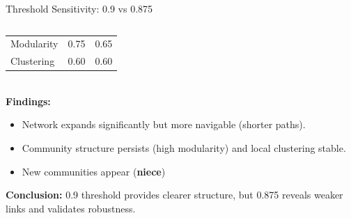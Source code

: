 \documentclass[nodes]{beamer}
\begin{document}
\begin{frame}{Threshold Sensitivity: 0.9 vs 0.875}
\begin{columns}[T]
\begin{column}{0.45\textwidth}
\begin{tabular}{lcc}
        Modularity         & 0.75         & 0.65          \\
        Clustering         & 0.60         & 0.60          \\
        \bottomrule
      \end{tabular}
      \vspace{0.1cm}
      \\ \textbf{Findings:}
      \begin{itemize}
          \item Network expands significantly but more navigable (shorter paths).
          \item \alert{Community structure persists} (high modularity) and local clustering stable.
          \item New communities appear (\textbf{niece})
      \end{itemize}
      \textbf{Conclusion:} 0.9 threshold provides clearer structure, but 0.875 reveals weaker links and validates robustness.
    \end{column}
  \end{columns}
\end{frame}
\end{document}

